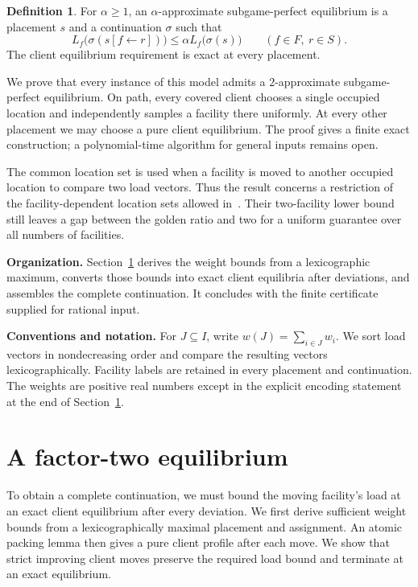\documentclass[11pt]{amsart}
\theoremstyle{definition}
\newtheorem{definition}[theorem]{Definition}
\begin{document}
\begin{definition}\label{def:spe}
For $\alpha\ge1$, an $\alpha$-approximate subgame-perfect equilibrium is a placement $s$ and a continuation $\sigma$ such that
\begin{equation}\label{eq:spe}
 L_f\bigl(\sigma(s[f\leftarrow r])\bigr)
 \le\alpha L_f\bigl(\sigma(s)\bigr)
 \qquad(f\in F,\ r\in S).
\end{equation}
The client equilibrium requirement is exact at every placement.
\end{definition}

We prove that every instance of this model admits a $2$-approximate subgame-perfect equilibrium. On path, every covered client chooses a single occupied location and independently samples a facility there uniformly. At every other placement we may choose a pure client equilibrium. The proof gives a finite exact construction; a polynomial-time algorithm for general inputs remains open.

The common location set is used when a facility is moved to another occupied location to compare two load vectors. Thus the result concerns a restriction of the facility-dependent location sets allowed in~\cite{krogmann2024}. Their two-facility lower bound still leaves a gap between the golden ratio and two for a uniform guarantee over all numbers of facilities.

\noindent\textbf{Organization.}
Section~\ref{sec:proof} derives the weight bounds from a lexicographic maximum, converts those bounds into exact client equilibria after deviations, and assembles the complete continuation. It concludes with the finite certificate supplied for rational input.

\noindent\textbf{Conventions and notation.}
For $J\subseteq I$, write $w(J)=\sum_{i\in J}w_i$. We sort load vectors in nondecreasing order and compare the resulting vectors lexicographically. Facility labels are retained in every placement and continuation. The weights are positive real numbers except in the explicit encoding statement at the end of Section~\ref{sec:proof}.

\section{A factor-two equilibrium}\label{sec:proof}
To obtain a complete continuation, we must bound the moving facility's load at an exact client equilibrium after every deviation. We first derive sufficient weight bounds from a lexicographically maximal placement and assignment. An atomic packing lemma then gives a pure client profile after each move. We show that strict improving client moves preserve the required load bound and terminate at an exact equilibrium.
\end{document}
